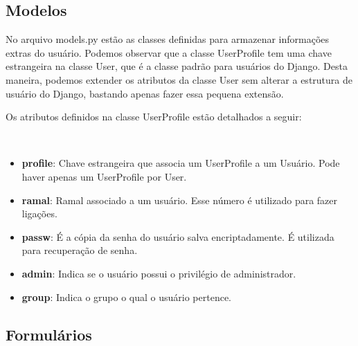 \documentclass[letterpaper,10pt,brazil]{sphinxmanual}
\begin{document}
\subsection{Modelos}
\label{apps/accounts:module-accounts.models}\label{apps/accounts:modelos}
No arquivo models.py estão as classes definidas para armazenar informações extras do usuário. Podemos observar que a classe UserProfile tem uma chave estrangeira na classe User, que é a classe padrão para usuários do Django. Desta maneira, podemos extender os atributos da classe User sem alterar a estrutura de usuário do Django, bastando apenas fazer essa pequena extensão.

Os atributos definidos na classe UserProfile estão detalhados a seguir:

\begin{fulllineitems}
\label{apps/accounts:accounts.models.UserProfile}~\begin{itemize}
\item {} 
\textbf{profile}: Chave estrangeira que associa um UserProfile a um Usuário. Pode haver apenas um UserProfile por User.

\item {} 
\textbf{ramal}: Ramal associado a um usuário. Esse número é utilizado para fazer ligações.

\item {} 
\textbf{passw}: É a cópia da senha do usuário salva encriptadamente. É utilizada para recuperação de senha.

\item {} 
\textbf{admin}: Indica se o usuário possui o privilégio de administrador.

\item {} 
\textbf{group}: Indica o grupo o qual o usuário pertence.

\end{itemize}

\end{fulllineitems}



\subsection{Formulários}
\label{apps/accounts:module-accounts.forms}\label{apps/accounts:formularios}
\end{document}
